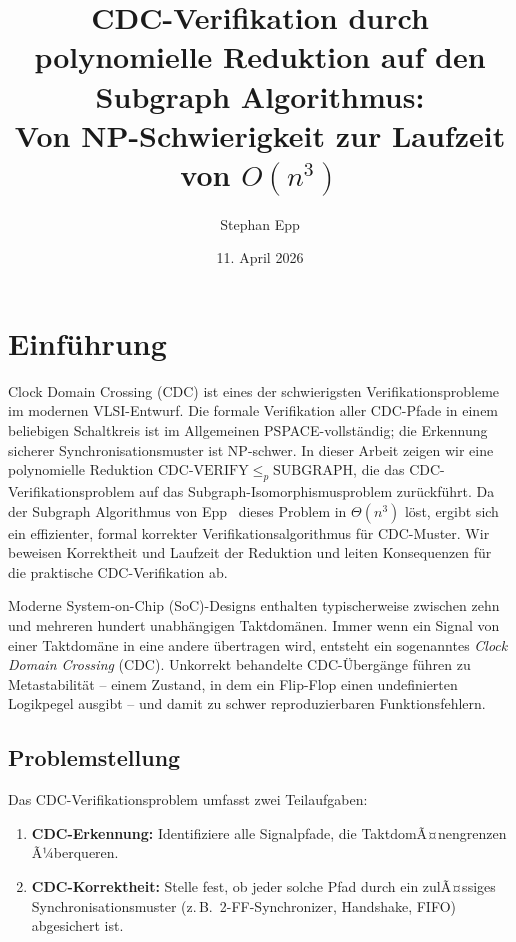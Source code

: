 ﻿\documentclass[a4paper,12pt]{article}
\title{{\bfseries CDC-Verifikation durch polynomielle Reduktion	auf den Subgraph Algorithmus}:\\
	{\Large Von NP-Schwierigkeit zur Laufzeit von  $O(n^3)$}}
\author{Stephan Epp}
\date{11. April 2026}
\theoremstyle{definition}
\begin{document}
	
	\maketitle	
	\tableofcontents
	\newpage
	
	\section{Einf\"uhrung}
	
	Clock Domain Crossing (CDC) ist eines der schwierigsten Verifikationsprobleme im modernen
	VLSI-Entwurf. Die formale Verifikation aller CDC-Pfade in einem beliebigen Schaltkreis
	ist im Allgemeinen PSPACE-vollst\"andig; die Erkennung sicherer Synchronisationsmuster
	ist NP-schwer. In dieser Arbeit zeigen wir eine polynomielle Reduktion
	$\mathrm{CDC\text{-}VERIFY} \leq_p \mathrm{SUBGRAPH}$, die das CDC-Verifikationsproblem
	auf das Subgraph-Isomorphismusproblem zur\"uckf\"uhrt. Da der Subgraph Algorithmus von
	Epp~\cite{epp2026subgraph} dieses Problem in $\Theta(n^3)$ l\"ost, ergibt sich ein
	effizienter, formal korrekter Verifikationsalgorithmus f\"ur CDC-Muster.
	Wir beweisen Korrektheit und Laufzeit der Reduktion und leiten Konsequenzen
	f\"ur die praktische CDC-Verifikation ab.
	
	Moderne System-on-Chip (SoC)-Designs enthalten typischerweise zwischen zehn und mehreren
	hundert unabh\"angigen Taktdom\"anen. Immer wenn ein Signal von einer Taktdom\"ane in
	eine andere \"ubertragen wird, entsteht ein sogenanntes \emph{Clock Domain Crossing}
	(CDC). Unkorrekt behandelte CDC-\"Uberg\"ange f\"uhren zu Metastabilit\"at -- einem
	Zustand, in dem ein Flip-Flop einen undefinierten Logikpegel ausgibt -- und damit zu
	schwer reproduzierbaren Funktionsfehlern.
	
	\subsection{Problemstellung}
	
	Das CDC-Verifikationsproblem umfasst zwei Teilaufgaben:
	\begin{enumerate}
		\item \textbf{CDC-Erkennung:} Identifiziere alle Signalpfade, die TaktdomÃ¤nengrenzen
		Ã¼ber\-queren.
		\item \textbf{CDC-Korrektheit:} Stelle fest, ob jeder solche Pfad durch ein
		zulÃ¤ssiges Synchronisationsmuster (z.\,B.\ 2-FF-Synchronizer,
		Handshake, FIFO) abgesichert ist.
	\end{enumerate}
	
\end{document}
